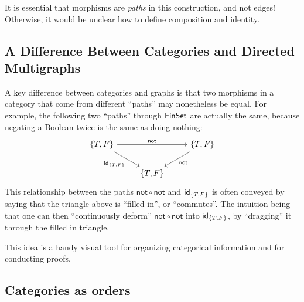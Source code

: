 \begin{note}
  It is essential that morphisms are \emph{paths} in this construction, and not edges!
  Otherwise, it would be unclear how to define composition and identity.
\end{note}

\subsection{A Difference Between Categories and Directed Multigraphs}

A key difference between categories and graphs is that
two morphisms in a category that come from
different ``paths'' may nonetheless be equal.
For example, the following two ``paths'' through \(\mathsf{FinSet}\)
are actually the same, because negating a Boolean twice is the same as doing nothing:
\[%
\begin{tikzcd}
{\{T,F\}} \arrow[rr, "\mathsf{not}"] \arrow[rd, "{\idt_{\{T,F\}}}"'] &           & {\{T,F\}} \arrow[ld, "\mathsf{not}"] \\
                                                                     & {\{T,F\}} &
\end{tikzcd}\]
This relationship between the paths \(\mathsf{not}\circ \mathsf{not}\) and \(\mathsf{id}_{\{T,F\}}\)
is often conveyed by saying that the triangle above is ``filled in'', or ``commutes''.
The intuition being that one can then ``continuously deform''
\(\mathsf{not}\circ\mathsf{not}\) into \(\mathsf{id}_{\{T,F\}}\),
by ``dragging'' it through the filled in triangle.

This idea is a handy visual tool for organizing categorical information
and for conducting proofs.

\subsection{Categories as orders}

